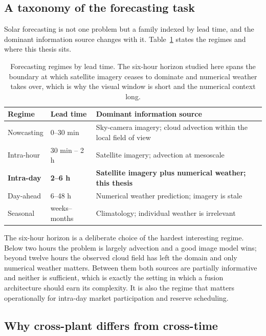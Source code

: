 \subsection{A taxonomy of the forecasting task}
\label{sec:taxonomy}

Solar forecasting is not one problem but a family indexed by lead time, and the dominant
information source changes with it. Table~\ref{tab:leadtime} states the regimes and where
this thesis sits.

\begin{table}[h!]
\centering
\small
\begin{tabular}{p{2.6cm} p{3.0cm} p{7.6cm}}
\hline
\textbf{Regime} & \textbf{Lead time} & \textbf{Dominant information source} \\
\hline
Nowcasting & 0--30 min & Sky-camera imagery; cloud advection within the local field of view \\
Intra-hour & 30 min -- 2 h & Satellite imagery; advection at mesoscale \\
\textbf{Intra-day} & \textbf{2--6 h} & \textbf{Satellite imagery plus numerical weather; this
thesis} \\
Day-ahead & 6--48 h & Numerical weather prediction; imagery is stale \\
Seasonal & weeks--months & Climatology; individual weather is irrelevant \\
\hline
\end{tabular}
\caption{Forecasting regimes by lead time. The six-hour horizon studied here spans the
boundary at which satellite imagery ceases to dominate and numerical weather takes over,
which is why the visual window is short and the numerical context long.}
\label{tab:leadtime}
\end{table}

The six-hour horizon is a deliberate choice of the hardest interesting regime. Below two
hours the problem is largely advection and a good image model wins; beyond twelve hours the
observed cloud field has left the domain and only numerical weather matters. Between them
both sources are partially informative and neither is sufficient, which is exactly the
setting in which a fusion architecture should earn its complexity. It is also the regime that
matters operationally for intra-day market participation and reserve scheduling.

\subsection{Why cross-plant differs from cross-time}
\label{sec:cross-plant-theory}

